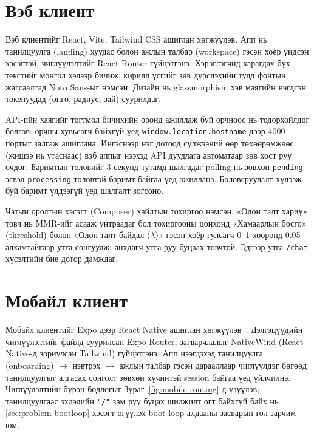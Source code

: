 \documentclass[../main.tex]{subfiles}
\begin{document}
\section{Вэб клиент}

Вэб клиентийг React, Vite, Tailwind CSS ашиглан хөгжүүлэв. Апп нь танилцуулга
(landing) хуудас болон ажлын талбар (workspace) гэсэн хоёр үндсэн хэсэгтэй,
чиглүүлэлтийг React Router гүйцэтгэнэ. Хэрэглэгчид харагдах бүх текстийг монгол
хэлээр бичиж, кирилл үсгийг зөв дүрслэхийн тулд фонтын жагсаалтад Noto Sans-ыг
нэмсэн. Дизайн нь glassmorphism хэв маягийн нэгдсэн токенуудад
(өнгө, радиус, зай) суурилдаг.

API-ийн хаягийг тогтмол бичихийн оронд ажиллаж буй орчноос нь тодорхойлдог
болгов:  орчны хувьсагч байхгүй үед
\texttt{window.location.hostname} дээр 4000 портыг залгаж ашиглана. Ингэснээр
нэг дотоод сүлжээний өөр төхөөрөмжөөс (жишээ нь утаснаас) вэб аппыг нээхэд API
дуудлага автоматаар зөв хост руу очдог. Баримтын төлөвийг 3 секунд тутамд
шалгадаг polling нь зөвхөн \texttt{pending} эсвэл \texttt{processing} төлөвтэй
баримт байгаа үед ажиллана. Боловсруулалт хүлээж буй баримт үлдээгүй үед
шалгалт зогсоно.

Чатын оролтын хэсэгт (Composer) хайлтын тохиргоо нэмсэн.
«Олон талт хариу» товч нь MMR-ийг асааж унтраадаг бол тохиргооны цонхонд
«Хамаарлын босго» (threshold) болон «Олон талт байдал ($\lambda$)» гэсэн хоёр
гулсагч 0--1 хооронд 0.05 алхамтайгаар утга сонгуулж, анхдагч утга руу буцаах
товчтой. Эдгээр утга \texttt{/chat} хүсэлтийн бие дотор дамждаг.

%

\section{Мобайл клиент}

Мобайл клиентийг Expo дээр React Native ашиглан хөгжүүлэв~\cite{expo}. Дэлгэцүүдийн
чиглүүлэлтийг файлд суурилсан Expo Router, загварчлалыг NativeWind (React
Native-д зориулсан Tailwind) гүйцэтгэнэ. Апп нээгдэхэд танилцуулга
(onboarding) $\rightarrow$ нэвтрэх $\rightarrow$ ажлын талбар гэсэн дарааллаар
чиглүүлдэг бөгөөд танилцуулгыг алгасах сонголт зөвхөн хүчинтэй session байгаа
үед үйлчилнэ. Чиглүүлэлтийн бүрэн бодлогыг Зураг~\ref{fig:mobile-routing}-д
үзүүлэв; танилцуулгаас эхлэлийн \texttt{"/"} зам руу буцах шилжилт огт
байхгүй байх нь \ref{sec:problem-bootloop} хэсэгт өгүүлэх boot loop алдааны
засварын гол зарчим юм.
\end{document}

